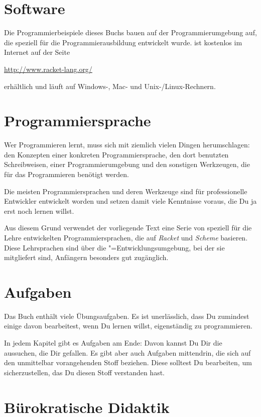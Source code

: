 \section{Software}

Die Programmierbeispiele dieses Buchs bauen auf der
Programmierumgebung \drscheme{}\index{\drscheme{}} auf, die speziell
für die Programmierausbildung entwickelt wurde. 
\drscheme{} ist kostenlos im Internet auf der Seite
%
\begin{center}
  \url{http://www.racket-lang.org/}
\end{center}
%
erhältlich und läuft auf Windows-, Mac- und Unix-/Linux-Rechnern.

\section{Programmiersprache}

Wer Programmieren lernt, muss sich mit ziemlich vielen Dingen
herumschlagen: den Konzepten einer konkreten Programmiersprache, den
dort benutzten Schreibweisen, einer Programmierumgebung und den
sonstigen Werkzeugen, die für das Programmieren benötigt werden.

Die meisten Programmiersprachen und deren Werkzeuge sind für
professionelle Entwickler entwickelt worden und setzen damit viele
Kenntnisse voraus, die Du ja erst noch lernen willst.

Aus diesem Grund verwendet der vorliegende Text eine Serie von
speziell für die Lehre entwickelten Programmiersprachen, die auf
\textit{Racket} und \textit{Scheme}
basieren.  Diese Lehrsprachen sind über die
\drscheme"=Entwicklungsumgebung, bei der sie mitgliefert sind,
Anfängern besonders gut zugänglich.

\section{Aufgaben}

Das Buch enthält viele Übungsaufgaben.  Es ist unerlässlich, dass Du
zumindest einige davon bearbeitest, wenn Du lernen willst,
eigenständig zu programmieren.

In jedem Kapitel gibt es Aufgaben am Ende: Davon kannst Du Dir die
aussuchen, die Dir gefallen.  Es gibt aber auch Aufgaben mittendrin,
die sich auf den unmittelbar vorangehenden Stoff beziehen.  Diese
solltest Du bearbeiten, um sicherzustellen, das Du diesen Stoff
verstanden hast.

\section{Bürokratische Didaktik}

